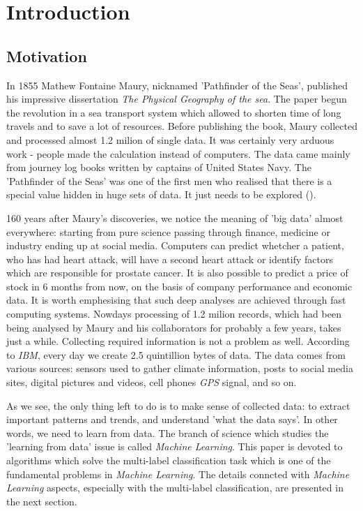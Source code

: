 
\chapter{Introduction}

\section{Motivation}

In 1855 Mathew Fontaine Maury, nicknamed 'Pathfinder of the Seas', published his impressive dissertation \textit{The Physical Geography of the sea}. The paper begun the revolution in a sea transport system which allowed to shorten time of long travels and to save a lot of resources. Before publishing the book, Maury collected and processed almost 1.2 milion of single data. It was certainly very arduous work - people made the calculation instead of computers. The data came mainly from journey log books written by captains of United States Navy. The 'Pathfinder of the Seas' was one of the first men who realised that there is a special value hidden in huge sets of data. It just needs to be explored (\cite{Data}).  

160 years after Maury's discoveries, we notice the meaning of 'big data' almost everywhere: starting from pure science passing through finance, medicine or industry ending up at social media. Computers can predict whetcher a patient, who has had heart attack, will have a second heart attack or identify factors which are responsible for prostate cancer. It is also possible to predict a price of stock in 6 months from now, on the basis of company performance and economic data.  
It is worth emphesising that such deep analyses are achieved through fast computing systems. Nowdays processing of 1.2 milion records, which had been being analysed by Maury and his collaborators for probably a few years, takes just a while. Collecting required information is not a problem as well. According to \textit{IBM}, every day we create 2.5 quintillion bytes of data. The data comes from various sources: sensors used to gather climate information, posts to social media sites, digital pictures and videos, cell phones \textit{GPS} signal, and so on.

As we see, the only thing left to do is to make sense of collected data: to extract important patterns and trends, and understand 'what the data says'. In other words, we need to learn from data. The branch of science which studies the 'learning from data' issue is called \textit{Machine Learning}. This paper is devoted to algorithms which solve the multi-label classification task which is one of the fundamental problems in \textit{Machine Learning}. The details conncted with \textit{Machine Learning} aspects, especially with the multi-label classification, are presented in the next section.


